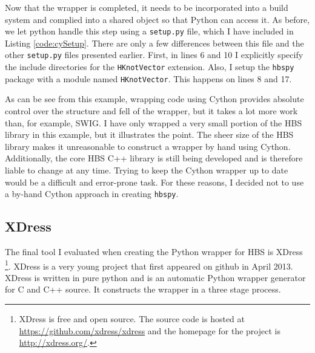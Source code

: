     Now that the wrapper is completed, it needs to be incorporated into a build system and complied into a shared object so that Python can access it. As before, we let python handle this step using a \texttt{setup.py} file, which I have included in Listing \ref{code:cySetup}. There are only a few differences between this file and the other \texttt{setup.py} files presented earlier. First, in lines 6 and 10 I explicitly specify the include directories for the \texttt{HKnotVector} extension. Also, I setup the \texttt{hbspy} package with a module named \texttt{HKnotVector}. This happens on lines 8 and 17.

    
    \mainstretch{}

    As can be see from this example, wrapping code using Cython provides absolute control over the structure and fell of the wrapper, but it takes a lot more work than, for example, SWIG. I have only wrapped a very small portion of the HBS library in this example, but it illustrates the point. The sheer size of the HBS library makes it unreasonable to construct a wrapper by hand using Cython. Additionally, the core HBS C++ library is still being developed and is therefore liable to change at any time. Trying to keep the Cython wrapper up to date would be a difficult and error-prone task. For these reasons, I decided not to use a by-hand Cython approach in creating \texttt{hbspy}.

\subsection{XDress} \label{sub:XDress}

  The final tool I evaluated when creating the Python wrapper for HBS is XDress \footnote{XDress is free and open source. The source code is hosted at \url{https://github.com/xdress/xdress} and the homepage for the project is \url{http://xdress.org/}.}. XDress is a very young project that first appeared on github in April 2013. XDress is written in pure python and is an automatic Python wrapper generator for C and C++ source. It constructs the wrapper in a three stage process.

